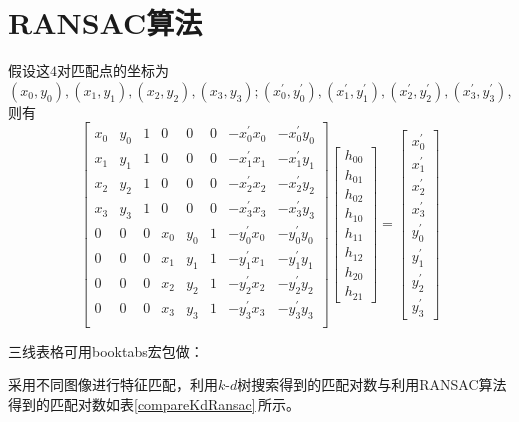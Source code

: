 \documentclass[10.5pt,a4paper]{article}
\numberwithin{equation}{section}
\numberwithin{figure}{section}
\numberwithin{table}{section}
\begin{document}
\section{RANSAC算法\label{section_ransac}}
假设这$4$对匹配点的坐标为$(x_0,y_0),(x_1,y_1),(x_2,y_2),(x_3,y_3);(x_0^\prime,y_0^\prime),(x_1^\prime,y_1^\prime),(x_2^\prime,y_2^\prime),(x_3^\prime,y_3^\prime)$,则有
\begin{equation}\label{solveh}
	\begin{bmatrix}
	x_0& y_0& 1& 0& 0& 0& -x_0^\prime x_0 & -x_0^\prime y_0\\
	x_1& y_1& 1& 0& 0& 0& -x_1^\prime x_1 & -x_1^\prime y_1\\
	x_2& y_2& 1& 0& 0& 0& -x_2^\prime x_2 & -x_2^\prime y_2\\
	x_3& y_3& 1& 0& 0& 0& -x_3^\prime x_3 & -x_3^\prime y_3\\
	0 & 0 & 0 & x_0 & y_0 & 1 & -y_0^\prime x_0 & -y_0^\prime y_0\\
	0 & 0 & 0 & x_1 & y_1 & 1 & -y_1^\prime x_1 & -y_1^\prime y_1\\
	0 & 0 & 0 & x_2 & y_2 & 1 & -y_2^\prime x_2 & -y_2^\prime y_2\\
	0 & 0 & 0 & x_3 & y_3 & 1 & -y_3^\prime x_3 & -y_3^\prime y_3\\
	\end{bmatrix}
	\begin{bmatrix}
	h_{00} \\ h_{01} \\ h_{02} \\ h_{10} \\ h_{11} \\ h_{12} \\ h_{20} \\ h_{21}
	\end{bmatrix}
	=
	\begin{bmatrix}
	x_0^\prime \\ x_1^\prime \\ x_2^\prime \\ x_3^\prime \\  y_0^\prime \\ y_1^\prime \\ y_2^\prime \\ y_3^\prime 
	\end{bmatrix}
\end{equation}
\par
三线表格可用booktabs宏包做：
\par
采用不同图像进行特征匹配，利用$k\text{-}d$树搜索得到的匹配对数与利用RANSAC算法得到的匹配对数如表\ref{compareKdRansac}\,所示。
\end{document}

